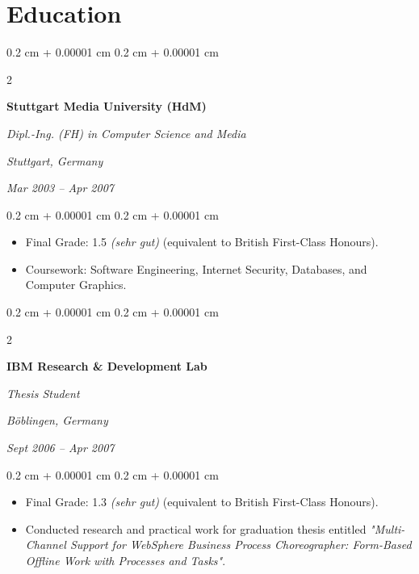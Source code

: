 \documentclass[10pt, a4paper]{article}
\newenvironment{highlights}{
    \begin{itemize}[
        topsep=0.10 cm,
        parsep=0.10 cm,
        partopsep=0pt,
        itemsep=0pt,
        leftmargin=0.4 cm + 10pt
    ]
}{
    \end{itemize}
} %
\newenvironment{onecolentry}{
    \begin{adjustwidth}{
        0.2 cm + 0.00001 cm
    }{
        0.2 cm + 0.00001 cm
    }
}{
    \end{adjustwidth}
} %
\newenvironment{twocolentry}[2][6cm]{ %
    \onecolentry
    \def\secondColumn{#2}
    \setcolumnwidth{\fill, #1} %
    \begin{paracol}{2}
}{
    \switchcolumn \raggedleft \secondColumn
    \end{paracol}
    \endonecolentry
} %
\begin{document}
%
%
\section{Education}




\begin{twocolentry}{
        \textit{Stuttgart, Germany}

        \textit{Mar 2003 – Apr 2007}}
    \textbf{Stuttgart Media University (HdM)}

    \textit{Dipl.-Ing. (FH) in Computer Science and Media}
\end{twocolentry}

\vspace{0.10 cm}
\begin{onecolentry}
    \begin{highlights}
        \item Final Grade: 1.5 \textit{(sehr gut)} (equivalent to British First-Class Honours).
        \item Coursework: Software Engineering, Internet Security, Databases, and Computer Graphics.
    \end{highlights}
\end{onecolentry}

\vspace{0.2 cm}

\begin{twocolentry}{

        \textit{Böblingen, Germany}

        \textit{Sept 2006 – Apr 2007}}
    \textbf{IBM Research \& Development Lab}

    \textit{Thesis Student}
\end{twocolentry}

\vspace{0.10 cm}
\begin{onecolentry}
    \begin{highlights}
        \item Final Grade: 1.3 \textit{(sehr gut)} (equivalent to British First-Class Honours).
        \item Conducted research and practical work for graduation thesis entitled \textit{"Multi-Channel Support for \mbox{WebSphere} Business Process Choreographer: Form-Based Offline Work with Processes and Tasks"}.
    \end{highlights}
\end{onecolentry}
\end{document}
